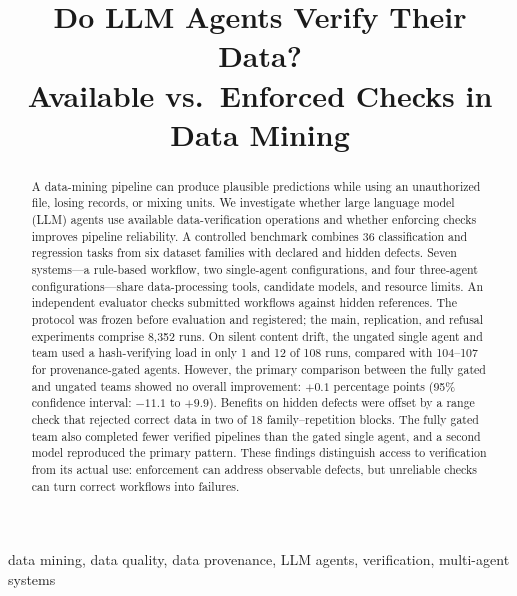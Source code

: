 \documentclass[conference]{IEEEtran}
\begin{document}
\title{Do LLM Agents Verify Their Data?\\ Available vs.\ Enforced Checks in Data Mining}
\author{
}
\maketitle

\begin{abstract}
A data-mining pipeline can produce plausible predictions while using an unauthorized file, losing records, or mixing units. We investigate whether large language model (LLM) agents use available data-verification operations and whether enforcing checks improves pipeline reliability. A controlled benchmark combines 36 classification and regression tasks from six dataset families with declared and hidden defects. Seven systems---a rule-based workflow, two single-agent configurations, and four three-agent configurations---share data-processing tools, candidate models, and resource limits. An independent evaluator checks submitted workflows against hidden references. The protocol was frozen before evaluation and registered; the main, replication, and refusal experiments comprise 8,352 runs. On silent content drift, the ungated single agent and team used a hash-verifying load in only 1 and 12 of 108 runs, compared with 104--107 for provenance-gated agents. However, the primary comparison between the fully gated and ungated teams showed no overall improvement: $+0.1$ percentage points (95\% confidence interval: $-11.1$ to $+9.9$). Benefits on hidden defects were offset by a range check that rejected correct data in two of 18 family--repetition blocks. The fully gated team also completed fewer verified pipelines than the gated single agent, and a second model reproduced the primary pattern. These findings distinguish access to verification from its actual use: enforcement can address observable defects, but unreliable checks can turn correct workflows into failures.
\end{abstract}
\begin{IEEEkeywords}
data mining, data quality, data provenance, LLM agents, verification, multi-agent systems
\end{IEEEkeywords}
\end{document}
